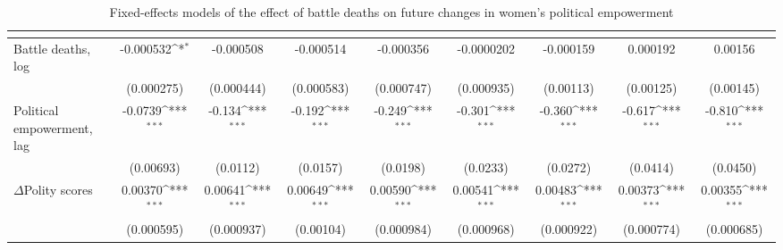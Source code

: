 \begin{table}[htbp]\centering
\def\sym#1{\ifmmode^{#1}\else\(^{#1}\)\fi}
\caption{Fixed-effects models of the effect of battle deaths on future changes in women's political empowerment\label{polbdeath}}
\begin{tabular}{l*{8}{c}}
\hline\hline
                    &&&&&&&&\\
\hline
Battle deaths, log        &   -0.000532\sym{*}  &   -0.000508         &   -0.000514         &   -0.000356         &  -0.0000202         &   -0.000159         &    0.000192         &     0.00156         \\
                    &  (0.000275)         &  (0.000444)         &  (0.000583)         &  (0.000747)         &  (0.000935)         &   (0.00113)         &   (0.00125)         &   (0.00145)         \\
[1em]
Political empowerment, lag  &     -0.0739\sym{***}&      -0.134\sym{***}&      -0.192\sym{***}&      -0.249\sym{***}&      -0.301\sym{***}&      -0.360\sym{***}&      -0.617\sym{***}&      -0.810\sym{***}\\
                    &   (0.00693)         &    (0.0112)         &    (0.0157)         &    (0.0198)         &    (0.0233)         &    (0.0272)         &    (0.0414)         &    (0.0450)         \\
[1em]
$\Delta$Polity scores          &     0.00370\sym{***}&     0.00641\sym{***}&     0.00649\sym{***}&     0.00590\sym{***}&     0.00541\sym{***}&     0.00483\sym{***}&     0.00373\sym{***}&     0.00355\sym{***}\\
                    &  (0.000595)         &  (0.000937)         &   (0.00104)         &  (0.000984)         &  (0.000968)         &  (0.000922)         &  (0.000774)         &  (0.000685)         \\

\end{tabular}
\end{table}
